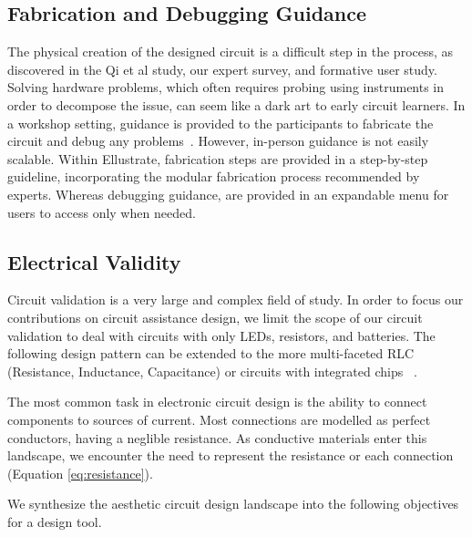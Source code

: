\documentclass{sigchi}
\begin{document}
\subsection{Fabrication and Debugging Guidance}
  The physical creation of the designed circuit is a difficult step in the process, as discovered in the Qi et al study, our expert survey, and formative user study. Solving hardware problems, which often requires probing using instruments in order to decompose the issue, can seem like a dark art to early circuit learners. In a workshop setting, guidance is provided to the participants to fabricate the circuit and debug any problems~\cite{qi_sketching_2014}. However, in-person guidance is not easily scalable. Within Ellustrate, fabrication steps are provided in a step-by-step guideline, incorporating the modular fabrication process recommended by experts. Whereas debugging guidance, are provided in an expandable menu for users to access only when needed. 


\subsection{Electrical Validity}
  Circuit validation is a very large and complex field of study. In order to focus our contributions on circuit assistance design, we limit the scope of our circuit validation to deal with circuits with only LEDs, resistors, and batteries. The following design pattern can be extended to the more multi-faceted RLC (Resistance, Inductance, Capacitance) or circuits with integrated chips ~\cite{mellis_microcontrollers_2013}.

  The most common task in electronic circuit design is the ability to connect components to sources of current. Most connections are modelled as perfect conductors, having a neglible resistance. As conductive materials enter this landscape, we encounter the need to represent the resistance or each connection (Equation \ref{eq:resistance}).

  We synthesize the aesthetic circuit design landscape into the following objectives for a design tool. 
    
\end{document}
